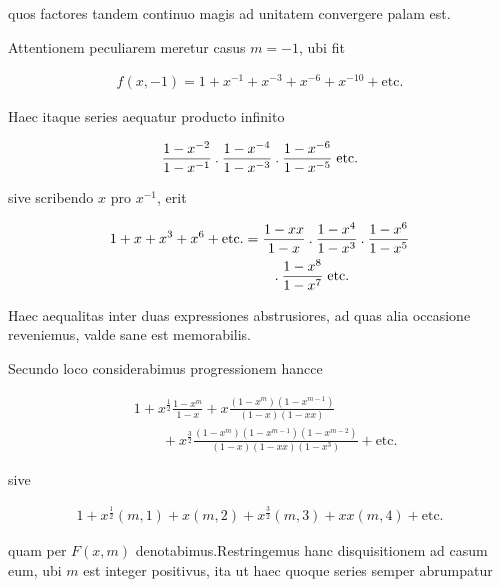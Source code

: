 quos factores tandem continuo magis ad unitatem convergere palam est.

Attentionem peculiarem meretur casus $m=-1$, ubi fit

\[
\begin{aligned}
f(x,-1)=1+x^{-1}+x^{-3}+x^{-6}+x^{-10}+\text{etc.}
\end{aligned}
\]

Haec itaque series aequatur producto infinito

\[
\begin{aligned}
\frac{1-x^{-2}}{1-x^{-1}}\mathbin{.}\frac{1-x^{-4}}{1-x^{-3}}\mathbin{.}\frac{1-x^{-6}}{1-x^{-5}}\;\text{etc.}
\end{aligned}
\]

sive scribendo $x$ pro $x^{-1}$, erit

\[
\begin{aligned}
1+x+x^3+x^6+\text{etc.}&=\frac{1-xx}{1-x}\mathbin{.}\frac{1-x^4}{1-x^3}\mathbin{.}\frac{1-x^6}{1-x^5}\\
&\qquad\mathbin{.}\frac{1-x^8}{1-x^7}\;\text{etc.}
\end{aligned}
\]

Haec aequalitas inter duas expressiones abstrusiores, ad quas alia occasione reveniemus, valde sane est memorabilis.


Secundo loco considerabimus progressionem hancce

\[
\begin{aligned}
&1+x^{\frac12}\frac{1-x^m}{1-x}+x\frac{(1-x^m)(1-x^{m-1})}{(1-x)(1-xx)}\\
&\qquad+x^{\frac32}\frac{(1-x^m)(1-x^{m-1})(1-x^{m-2})}{(1-x)(1-xx)(1-x^3)}+\text{etc.}
\end{aligned}
\]

sive

\[
\begin{aligned}
1+x^{\frac12}(m,1)+x(m,2)+x^{\frac32}(m,3)+xx(m,4)+\text{etc.}
\end{aligned}
\]

quam per $F(x,m)$ denotabimus.\quad Restringemus hanc disquisitionem ad casum eum, ubi $m$ est integer positivus, ita ut haec quoque series semper abrumpatur %
